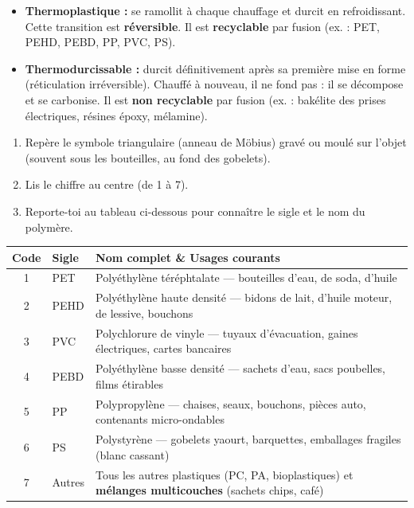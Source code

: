 \documentclass[11pt]{article}
\begin{document}
\begin{propriete}
\begin{itemize}
\item \textbf{Thermoplastique :} se ramollit à chaque chauffage et durcit en refroidissant. Cette transition est \textbf{réversible}. Il est \textbf{recyclable} par fusion (ex. : PET, PEHD, PEBD, PP, PVC, PS).
\item \textbf{Thermodurcissable :} durcit définitivement après sa première mise en forme (réticulation irréversible). Chauffé à nouveau, il ne fond pas : il se décompose et se carbonise. Il est \textbf{non recyclable} par fusion (ex. : bakélite des prises électriques, résines époxy, mélamine).
\end{itemize}
\end{propriete}

\begin{methode}
\begin{enumerate}
\item Repère le symbole triangulaire (anneau de Möbius) gravé ou moulé sur l'objet (souvent sous les bouteilles, au fond des gobelets).
\item Lis le chiffre au centre (de 1 à 7).
\item Reporte-toi au tableau ci-dessous pour connaître le sigle et le nom du polymère.
\end{enumerate}
\end{methode}

\begin{center}
\begin{tabularx}{\linewidth}{|c|l|X|}
\hline
\rowcolor{popblueL} \textbf{Code} & \textbf{Sigle} & \textbf{Nom complet \& Usages courants} \\
\hline
1 & PET & Polyéthylène téréphtalate — bouteilles d'eau, de soda, d'huile \\
\hline
2 & PEHD & Polyéthylène haute densité — bidons de lait, d'huile moteur, de lessive, bouchons \\
\hline
3 & PVC & Polychlorure de vinyle — tuyaux d'évacuation, gaines électriques, cartes bancaires \\
\hline
4 & PEBD & Polyéthylène basse densité — sachets d'eau, sacs poubelles, films étirables \\
\hline
5 & PP & Polypropylène — chaises, seaux, bouchons, pièces auto, contenants micro-ondables \\
\hline
6 & PS & Polystyrène — gobelets yaourt, barquettes, emballages fragiles (blanc cassant) \\
\hline
7 & Autres & Tous les autres plastiques (PC, PA, bioplastiques) et \textbf{mélanges multicouches} (sachets chips, café) \\
\hline
\end{tabularx}
\end{center}
\end{document}
